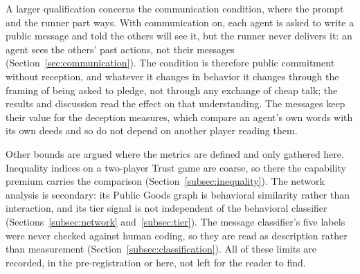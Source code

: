 A larger qualification concerns the communication condition, where the prompt and
the runner part ways. With communication on, each agent is asked to write a public
message and told the others will see it, but the runner never delivers it: an agent
sees the others' past actions, not their messages (Section~\ref{sec:communication}).
The condition is therefore public commitment without reception, and whatever it
changes in behavior it changes through the framing of being asked to pledge, not
through any exchange of cheap talk; the results and discussion read the effect on
that understanding. The messages keep their value for the deception measures, which
compare an agent's own words with its own deeds and so do not depend on another
player reading them.

Other bounds are argued where the metrics are defined and only gathered here.
Inequality indices on a two-player Trust game are coarse, so there the capability
premium carries the comparison (Section~\ref{subsec:inequality}). The network
analysis is secondary: its Public Goods graph is behavioral similarity rather than
interaction, and its tier signal is not independent of the behavioral classifier
(Sections~\ref{subsec:network} and~\ref{subsec:tier}). The message classifier's
five labels were never checked against human coding, so they are read as
description rather than measurement (Section~\ref{subsec:classification}). All of
these limits are recorded, in the pre-registration or here, not left for the
reader to find.
